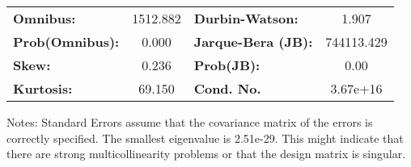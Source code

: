 \begin{center}
\begin{tabular}{lcccccc}
\bottomrule
\end{tabular}
\begin{tabular}{lclc}
\textbf{Omnibus:}       & 1512.882 & \textbf{  Durbin-Watson:     } &     1.907   \\
\textbf{Prob(Omnibus):} &   0.000  & \textbf{  Jarque-Bera (JB):  } & 744113.429  \\
\textbf{Skew:}          &   0.236  & \textbf{  Prob(JB):          } &      0.00   \\
\textbf{Kurtosis:}      &  69.150  & \textbf{  Cond. No.          } &  3.67e+16   \\
\bottomrule
\end{tabular}
\end{center}

Notes: \newline
 [1] Standard Errors assume that the covariance matrix of the errors is correctly specified. \newline
 [2] The smallest eigenvalue is 2.51e-29. This might indicate that there are \newline
 strong multicollinearity problems or that the design matrix is singular.